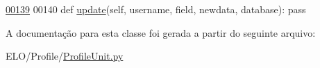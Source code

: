 \begin{DoxyCode}
\hypertarget{classProfile_1_1ProfileUnit_1_1IfPersProfile_l00139}{}\hyperlink{classProfile_1_1ProfileUnit_1_1IfPersProfile_ae2d65e1ead2780de7b97fab078bb425e}{00139} 
00140     \textcolor{keyword}{def }\hyperlink{classProfile_1_1ProfileUnit_1_1IfPersProfile_ae2d65e1ead2780de7b97fab078bb425e}{update}(self, username, field, newdata, database): \textcolor{keyword}{pass}

\end{DoxyCode}


A documentação para esta classe foi gerada a partir do seguinte arquivo\-:\begin{DoxyCompactItemize}
\item 
E\-L\-O/\-Profile/\hyperlink{ProfileUnit_8py}{Profile\-Unit.\-py}\end{DoxyCompactItemize}
